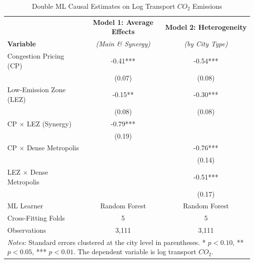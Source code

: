 \begin{table}[htbp]
\centering
\caption{Double ML Causal Estimates on Log Transport $CO_2$ Emissions}
\label{tab:baseline_results_table}
\begin{tabular}{lcc}
\hline\hline
 & \textbf{Model 1: Average Effects} & \textbf{Model 2: Heterogeneity} \\
\textbf{Variable} & \textit{(Main \& Synergy)} & \textit{(by City Type)} \\
\hline
Congestion Pricing (CP) & -0.41*** & -0.54*** \\
 & (0.07) & (0.08) \\[0.4em]
Low-Emission Zone (LEZ) & -0.15** & -0.30*** \\
 & (0.08) & (0.08) \\[0.4em]
CP $\times$ LEZ (Synergy) & -0.79*** &  \\
 & (0.19) &  \\[0.4em]
CP $\times$ Dense Metropolis &  & -0.76*** \\
 &  & (0.14) \\[0.4em]
LEZ $\times$ Dense Metropolis &  & -0.51*** \\
 &  & (0.17) \\[0.4em]
\hline
ML Learner & Random Forest & Random Forest \\
Cross-Fitting Folds & 5 & 5 \\
Observations & 3,111 & 3,111 \\
\hline\hline
\multicolumn{3}{p{12.5cm}}{\footnotesize \textit{Notes:} Standard errors clustered at the city level in parentheses. * $p<0.10$, ** $p<0.05$, *** $p<0.01$. The dependent variable is log transport $CO_2$.}
\end{tabular}
\end{table}
